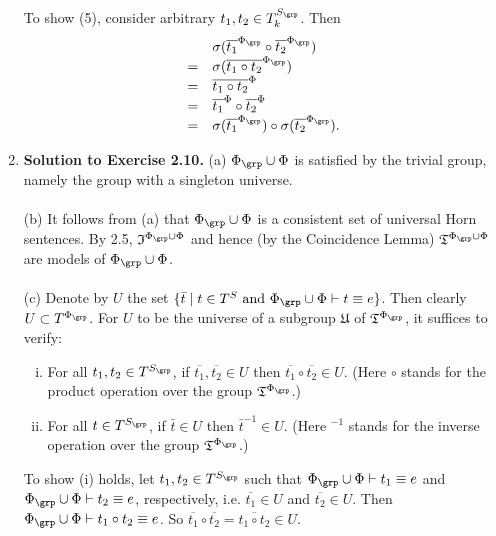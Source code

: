 \begin{enumerate}[1.]
\[\]
To show (5), consider arbitrary $t_1, t_2 \in T_k^{S_\grp}$. Then
\[
\begin{array}{ll}
\ & \sigma (\overline{t_1}^{\Phi_\grp} \circ \overline{t_2}^{\Phi_\grp}) \cr
= & \sigma (\overline{t_1 \circ t_2}^{\Phi_\grp}) \cr
= & \overline{t_1 \circ t_2}^\Phi \cr
= & \overline{t_1}^\Phi \circ \overline{t_2}^\Phi \cr
= & \sigma (\overline{t_1}^{\Phi_\grp}) \circ \sigma (\overline{t_2}^{\Phi_\grp}).
\end{array}
\]
%
\item \textbf{Solution to Exercise 2.10.} (a) $\Phi_\grp \cup \Phi$ is satisfied by the trivial group, namely the group with a singleton universe.\\
\ \\
(b) It follows from (a) that $\Phi_\grp \cup \Phi$ is a consistent set of universal Horn sentences. By 2.5, $\mathfrak{I}^{\Phi_\grp \cup \Phi}$ and hence (by the Coincidence Lemma) $\mathfrak{T}^{\Phi_\grp \cup \Phi}$ are models of $\Phi_\grp \cup \Phi$.\\
\ \\
(c) Denote by $U$ the set $\{ \bar{t} \mid \mbox{\begin{math}t \in T^S\end{math} and \begin{math}\Phi_\grp \cup \Phi \vdash t \equiv e\end{math}}\}$. Then clearly $U \subset T^{\Phi_\grp}$. For $U$ to be the universe of a subgroup $\mathfrak{U}$ of $\mathfrak{T}^{\Phi_\grp}$, it suffices to verify:
\begin{enumerate}[(i)]
\item For all $t_1, t_2 \in T^{S_\grp}$, if $\overline{t_1}, \overline{t_2} \in U$ then $\overline{t_1} \circ \overline{t_2} \in U$. (Here $\circ$ stands for the product operation over the group $\mathfrak{T}^{\Phi_\grp}$.)
\item For all $t \in T^{S_\grp}$, if $\bar{t} \in U$ then $\bar{t}^{-1} \in U$. (Here $^{-1}$ stands for the inverse operation over the group $\mathfrak{T}^{\Phi_\grp}$.)
\end{enumerate}
To show (i) holds, let $t_1, t_2 \in T^{S_\grp}$ such that $\Phi_\grp \cup \Phi \vdash t_1 \equiv e$ and $\Phi_\grp \cup \Phi \vdash t_2 \equiv e$, respectively, i.e. $\overline{t_1} \in U$ and $\overline{t_2} \in U$. Then $\Phi_\grp \cup \Phi \vdash t_1 \circ t_2 \equiv e$. So $\overline{t_1} \circ \overline{t_2} = \overline{t_1 \circ t_2} \in U$.\\
\ \\

\end{enumerate}
